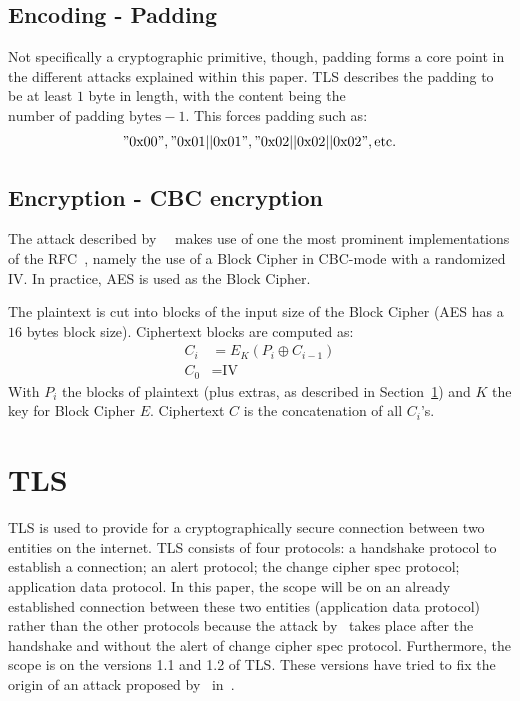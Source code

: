 \documentclass[10pt,conference,a4paper]{IEEEtran}
\begin{document}
\subsection{Encoding - Padding}
\label{sec:crypto:padding}
Not specifically a cryptographic primitive, though, padding forms a core point in the different attacks explained within this paper. TLS describes the padding to be at least $1$ byte in length, with the content being the $\text{number of padding bytes} - 1$. This forces padding such as:
\["0\text{x}00", "0\text{x}01||0\text{x}01", "0\text{x}02||0\text{x}02||0\text{x}02", \text{etc.} \]

\subsection{Encryption - CBC encryption}
\label{sec:crypto:encryption}
The attack described by~\citeauthor{alfardan2013lucky}~\cite{alfardan2013lucky} makes use of one the most prominent implementations of the RFC~\cite{ietf2008transport}, namely the use of a Block Cipher in CBC-mode with a randomized IV. In practice, AES is used as the Block Cipher.

The plaintext is cut into blocks of the input size of the Block Cipher (AES has a $16$ bytes block size). Ciphertext blocks are computed as:
\[ 
\begin{split}
C_i &= E_K(P_i \oplus C_{i-1}) \\
C_0 &= \text{IV} 
\end{split}
\]
With $P_i$ the blocks of plaintext (plus extras, as described in Section~\ref{sec:tls}) and $K$ the key for Block Cipher $E$. Ciphertext $C$ is the concatenation of all $C_i$'s.



\section{TLS}
\label{sec:tls}
TLS is used to provide for a cryptographically secure connection between two entities on the internet. TLS consists of four protocols: a handshake protocol to establish a connection; an alert protocol; the change cipher spec protocol; application data protocol. In this paper, the scope will be on an already established connection between these two entities (application data protocol) rather than the other protocols because the attack by~\citeauthor{alfardan2013lucky} takes place after the handshake and without the alert of change cipher spec protocol. Furthermore, the scope is on the versions 1.1 and 1.2 of TLS. These versions have tried to fix the origin of an attack proposed by~\citeauthor{vaudenay2002security} in~\cite{vaudenay2002security}.
\end{document}
